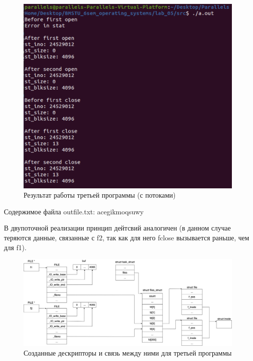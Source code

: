 \documentclass[12pt]{report}
\begin{document}
\begin{figure}[H]
	\centering
	\includegraphics[scale=0.8]{img/prog_03_thread.png}
	\caption{Результат работы третьей программы (с потоками)}
	\label{fig:prog_03_thread}
\end{figure}

Содержимое файла outfile.txt: acegikmoqsuwy

В двупоточной реализации принцип дейтсвий аналогичен (в данном случае теряются данные, связанные с f2, так как для него fclose вызывается раньше, чем для f1).



\begin{figure}[H]
	\centering
	\includegraphics[scale=0.32]{img/prog_03_schema.jpg}
	\caption{Созданные дескрипторы и связь между ними для третьей программы}
	\label{fig:prog_03_schema}
\end{figure}





	
\end{document}

